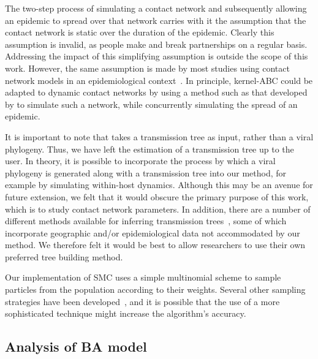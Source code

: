 The two-step process of simulating a contact network and subsequently allowing
an epidemic to spread over that network carries with it the assumption that the
contact network is static over the duration of the epidemic. Clearly this
assumption is invalid, as people make and break partnerships on a regular
basis. Addressing the impact of this simplifying assumption is outside the
scope of this work. However, the same assumption is made by most studies using
contact network models in an epidemiological
context~\autocite{welch2011statistical, bansal2007individual}. In principle,
kernel-\gls{ABC} could be adapted to dynamic contact networks by using a method
such as that developed by \textcite{robinson2012dynamics} to simulate such a
network, while concurrently simulating the spread of an epidemic.

It is important to note that  takes a transmission tree as
input, rather than a viral phylogeny. Thus, we have left the estimation of a
transmission tree up to the user. In theory, it is possible to incorporate the
process by which a viral phylogeny is generated along with a transmission tree
into our method, for example by simulating within-host dynamics. Although this
may be an avenue for future extension, we felt that it would obscure the
primary purpose of this work, which is to study contact network parameters.
In addition, there are a number of different methods available for inferring
transmission trees~\autocite{didelot2014bayesian, ypma2012unravelling,
jombart2011reconstructing, cottam2008integrating, poon2015phylodynamic}, some
of which incorporate geographic and/or epidemiological data not accommodated by
our method. We therefore felt it would be best to allow researchers to use
their own preferred tree building method.

Our implementation of \gls{SMC} uses a simple multinomial scheme to sample
particles from the population according to their weights. Several other
sampling strategies have been developed~\autocite{douc2005comparison}, and it
is possible that the use of a more sophisticated technique might increase the
algorithm's accuracy. 

\subsection{Analysis of \acrlong{BA} model}

